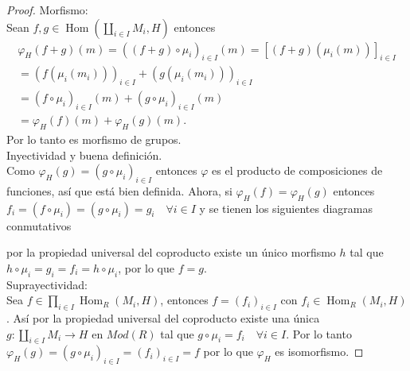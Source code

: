 \documentclass{article}
\begin{document}
\begin{enumerate}[label=\textbf{Ej \arabic*.}]
		\begin{proof}
			Morfismo: \\Sean $f,g\in  \operatorname{Hom}\left(\displaystyle\coprod_{i\in I}M_i,H\right)$ entonces
			\begin{gather*}
				\varphi_H(f+g)(m)=((f+g)\circ \mu_i)_{i\in I}(m)= [(f+g)(\mu_i(m))]_{i\in I} \\
				=(f(\mu_i(m_i)))_{i\in I}+(g(\mu_i(m_i)))_{i\in I}\\
				=(f\circ \mu_i)_{i\in I}(m)+(g\circ \mu_i)_{i\in I}(m)\\
				=\varphi_H(f)(m)+\varphi_H(g)(m).
			\end{gather*}
			Por lo tanto es morfismo de grupos.\\
			
			Inyectividad y buena definición.\\
			
			Como $\varphi_H(g)= (g\circ \mu_i)_{i\in I}$ entonces $\varphi$ es el producto de composiciones de funciones, así que está bien definida. Ahora,
			si $\varphi_H(f)=\varphi_H(g)$ entonces $ f_i=(f\circ \mu_i)=(g\circ \mu_i)=g_i\quad \forall i\in I $ y se tienen los siguientes diagramas conmutativos
			
			
			por la propiedad universal del coproducto existe un único morfismo $h$ tal que $h\circ\mu_i=g_i=f_i=h\circ\mu_i$, por lo que $f=g$.\\
			
			Suprayectividad:\\
			Sea $f\in \prod_{i\in I}\operatorname{Hom}_R\left(M_i,H\right)$, entonces $f=(f_i)_{i\in I}$ con $f_i\in \operatorname{Hom}_R\left(M_i,H\right)$. 
			Así por la propiedad universal del coproducto existe una única \\$g\colon\displaystyle\coprod_{i\in I}M_i\longrightarrow H$ en $Mod(R)$
			tal que $g\circ \mu_i=f_i\quad \forall i\in I$. Por lo tanto $\varphi_H(g)=(g\circ\mu_i)_{i\in I}=(f_i)_{i\in I}=f$ por lo que $\varphi_H$ es isomorfismo.
		\end{proof}
		

\end{enumerate}
\end{document}
